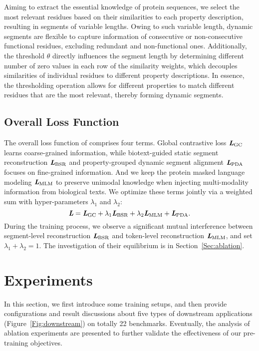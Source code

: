 Aiming to extract the essential knowledge of protein sequences, we select the most relevant residues based on their similarities to each property description, resulting in segments of variable lengths. Owing to such variable length, dynamic segments are flexible to capture information of consecutive or non-consecutive functional residues, excluding redundant and non-functional ones. Additionally, the threshold $\theta$ directly influences the segment length by determining different number of zero values in each row of the similarity weights, which decouples similarities of individual residues to different property descriptions. In essence, the thresholding operation allows for different properties to match different residues that are the most relevant, thereby forming dynamic segments.

\subsection{Overall Loss Function}
The overall loss function of \ourapproach comprises four terms. Global contrastive loss $\textit{\textbf{L}}_{\text{GC}}$ learns coarse-grained information, while biotext-guided static segment reconstruction $\textit{\textbf{L}}_{\text{BSR}}$ and property-grouped dynamic segment alignment $\textit{\textbf{L}}_{\text{PDA}}$ focuses on fine-grained information. And we keep the protein masked language modeling $\textit{\textbf{L}}_{\text{MLM}}$ to preserve unimodal knowledge when injecting multi-modality information from biological texts.
We optimize these terms jointly via a weighted sum with hyper-parameters $\lambda_1$ and $\lambda_2$:
\begin{equation}
    \textit{\textbf{L}} = \textit{\textbf{L}}_{\text{GC}}+\lambda_1 \textit{\textbf{L}}_{\text{BSR}}+\lambda_2 \textit{\textbf{L}}_{\text{MLM}}+\textit{\textbf{L}}_{\text{PDA}}.
\end{equation}
During the training process, we observe a significant mutual interference between segment-level reconstruction $\textit{\textbf{L}}_{\text{BSR}}$ and token-level reconstruction $\textit{\textbf{L}}_{\text{MLM}}$, and set $\lambda_1+\lambda_2=1$. The investigation of their equilibrium is in Section~\ref{Sec:ablation}.

\section{Experiments}
In this section, we first introduce some training setups, and then provide configurations and result discussions about five types of downstream applications (Figure~\ref{Fig:downstream}) on totally 22 benchmarks. Eventually, the analysis of ablation experiments are presented to further validate the effectiveness of our pre-training objectives.

